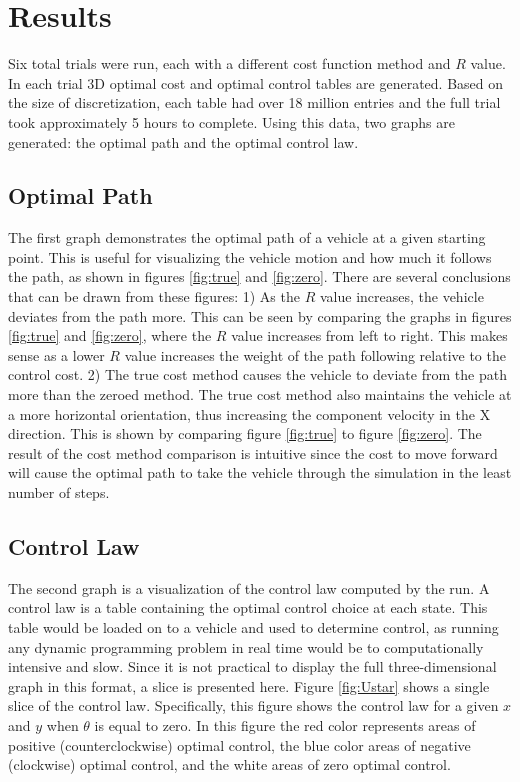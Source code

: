 \section{Results}
Six total trials were run, each with a different cost function method and $R$ value. In each trial 3D optimal cost and optimal control tables are generated. Based on the size of discretization, each table had over 18 million entries and the full trial took approximately 5 hours to complete. Using this data, two graphs are generated: the optimal path and the optimal control law. 
\subsection{Optimal Path}
The first graph demonstrates the optimal path of a vehicle at a given starting point. This is useful for visualizing the vehicle motion and how much it follows the path, as shown in figures \ref{fig:true} and \ref{fig:zero}. There are several conclusions that can be drawn from these figures: 1) As the $R$ value increases, the vehicle deviates from the path more. This can be seen by comparing the graphs in figures \ref{fig:true} and \ref{fig:zero}, where the $R$ value increases from left to right. This makes sense as a lower $R$ value increases the weight of the path following relative to the control cost. 2) The true cost method causes the vehicle to deviate from the path more than the zeroed method. The true cost method also maintains the vehicle at a more horizontal orientation, thus increasing the component velocity in the X direction. This is shown by comparing figure \ref{fig:true} to figure \ref{fig:zero}. The result of the cost method comparison is intuitive since the cost to move forward will cause the optimal path to take the vehicle through the simulation in the least number of steps.

\subsection{Control Law}
The second graph is a visualization of the control law computed by the run. A control law is a table containing the optimal control choice at each state. This table would be loaded on to a vehicle and used to determine control, as running any dynamic programming problem in real time would be to computationally intensive and slow. Since it is not practical to display the full three-dimensional graph in this format, a slice is presented here. Figure \ref{fig:Ustar} shows a single slice of the control law. Specifically, this figure shows the control law for a given $x$ and $y$ when $\theta$ is equal to zero. In this figure the red color represents areas of positive (counterclockwise) optimal control, the blue color areas of negative (clockwise) optimal control, and the white areas of zero optimal control. 


